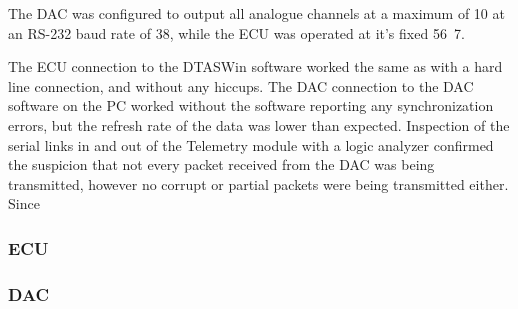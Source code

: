 The DAC was configured to output all analogue channels at a maximum of \unit{10}{\hertz} at an RS-232 baud rate of \unit{38}{\kilo\bit\per\second}, while the ECU was operated at it's fixed \unit{56.7}{\kilo\bit\per\second}.

The ECU connection to the DTASWin software worked the same as with a hard line connection, and without any hiccups. The DAC connection to the DAC software on the PC worked without the software reporting any synchronization errors, but the refresh rate of the data was lower than expected. Inspection of the serial links in and out of the Telemetry module with a logic analyzer confirmed the suspicion that not every packet received from the DAC was being transmitted, however no corrupt or partial packets were being transmitted either. Since

\subsubsection{ECU}

\subsubsection{DAC}